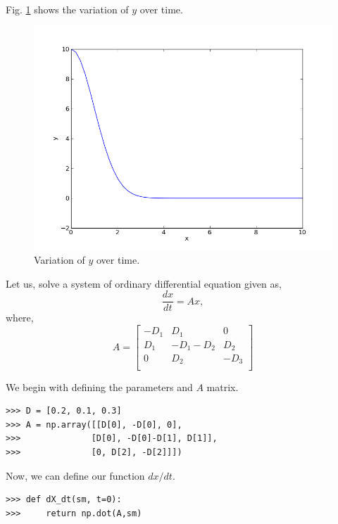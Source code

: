 \documentclass[10pt]{book}
\begin{document}
{Fig. \ref{fig:ode} shows the variation of $y$ over time. 

\beforefig
\begin{figure}[h!]
  \centering
    \includegraphics[scale=0.5]{images/ode.png}
  \caption{Variation of $y$ over time.}
   \label{fig:ode}
\end{figure}
\afterfig

Let us, solve a system of ordinary differential equation given as,
\begin{equation}
\frac{dx}{dt} = Ax,
\end{equation}
where,
\begin{equation}
A = \begin{bmatrix}
  -D_1 & D_1 & 0 \\
  D_1 & -D_1-D_2 & D_2 \\
  0 & D_2 & -D_3\\
 \end{bmatrix}
\end{equation}

We begin with defining the parameters and $A$ matrix. 
\beforeverb \begin{verbatim}
>>> D = [0.2, 0.1, 0.3]
>>> A = np.array([[D[0], -D[0], 0],
>>>              [D[0], -D[0]-D[1], D[1]],
>>>              [0, D[2], -D[2]]])
\end{verbatim} \afterverb

Now, we can define our function $dx/dt$. 
\beforeverb \begin{verbatim}                 
>>> def dX_dt(sm, t=0):
>>>     return np.dot(A,sm)
\end{verbatim} \afterverb

}
\end{document}
